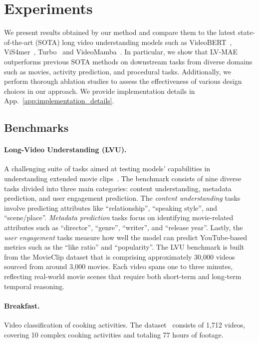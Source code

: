 \vspace{-0.5em}
\section{Experiments}
\label{sec:experiments}



We present results obtained by our method and compare them to the latest state-of-the-art (SOTA) long video understanding models such as VideoBERT~\cite{sun2019videobert}, ViS4mer~\cite{islam2022long}, Turbo~\cite{Han22b} and VideoMamba~\cite{li2024videomamba}. In particular, we show that LV-MAE outperforms previous SOTA methods on downstream tasks from diverse domains such as movies, activity prediction, and procedural tasks. Additionally, we perform thorough ablation studies to assess the effectiveness of various design choices in our approach. We provide implementation details in App.~\ref{app:implementation_details}.



\subsection{Benchmarks}
\paragraph{Long-Video Understanding (LVU).} A challenging suite of tasks aimed at testing models' capabilities in understanding extended movie clips~\cite{wu2021towards}.
The benchmark consists of nine diverse tasks divided into three main categories: content understanding, metadata prediction, and user engagement prediction.
The \emph{content understanding} tasks involve predicting attributes like ``relationship'', ``speaking style'', and ``scene/place''. \emph{Metadata prediction} tasks focus on identifying movie-related attributes such as ``director'', ``genre'', ``writer'', and ``release year''.
Lastly, the \emph{user engagement} tasks measure how well the model can predict YouTube-based metrics such as the ``like ratio'' and ``popularity''. 
The LVU benchmark is built from the MovieClip dataset that is comprising approximately 30,000 videos sourced from around 3,000 movies. 
Each video spans one to three minutes, reflecting real-world movie scenes that require both short-term and long-term temporal reasoning.
\vspace{-1.5em}
\paragraph{Breakfast.} Video classification of cooking activities.
The dataset~\cite{kuehne2014language} consists of 1,712 videos, covering 10 complex cooking activities and totaling 77 hours of footage.
\vspace{-1.5em}
